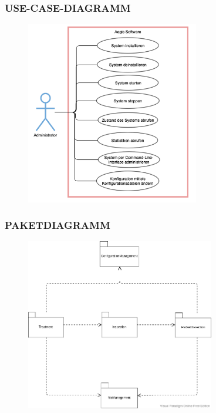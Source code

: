 \documentclass{beamer}
\begin{document}

\begin{frame}
    \frametitle{USE-CASE-DIAGRAMM}
    \begin{figure}[ht]
        \centering
        \includegraphics[height=8cm]{img/use_case_diagram_1.png}
    \end{figure}
\end{frame}

\begin{frame}
    \frametitle{PAKETDIAGRAMM}
    \begin{figure}[ht]
        \centering
        \includegraphics[height=7.5cm]{img/dos_paketdiagramm.png}
    \end{figure}
\end{frame}
\end{document}
